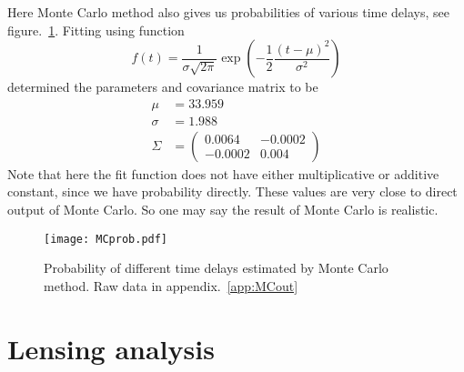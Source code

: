 Here Monte Carlo method also gives us probabilities of various time delays, see figure.~\ref{fig:MCprob}. Fitting using function
\begin{equation*}
	f(t) = \frac{1}{\sigma \sqrt{2\pi}} \exp(-\frac{1}{2} \frac{(t-\mu)^2}{\sigma^2}) 
\end{equation*}
determined the parameters and covariance matrix to be
\begin{align*}
	\mu &= 33.959 \\
	\sigma &= 1.988 \\
	\Sigma &= \begin{pmatrix} 0.0064 & -0.0002 \\ -0.0002 & 0.004 \end{pmatrix}
\end{align*}
Note that here the fit function does not have either multiplicative or additive constant, since we have probability directly. These values are very close to direct output of Monte Carlo. So one may say the result of Monte Carlo is realistic.
\begin{figure}[ht]
	\centering
	\texttt{[image: MCprob.pdf]}
	\caption{Probability of different time delays estimated by Monte Carlo method. Raw data in appendix.~\ref{app:MCout}}%
	\label{fig:MCprob}
\end{figure}
\section{Lensing analysis}
